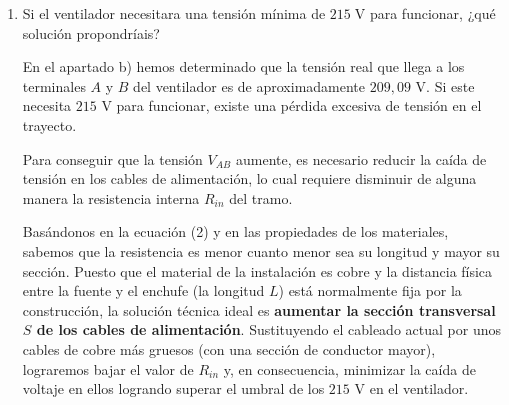 \documentclass[11pt, a4paper]{article}
\newenvironment{problem}[1][Cuestión]{
		\vspace{0.5cm}
		\noindent{\Large\bfseries #1} \par\vspace{0.5cm}
}{
		\vspace{0.5cm}
}
\begin{document}
\begin{problem}[Cuestión 2]
\begin{enumerate}[label=\alph*)]
{					Despejando la sección $S$ de la fórmula anterior, tenemos:
					$$S = \rho \frac{L}{R_{in}} = 1,68 \cdot 10^{-8} \; \Omega \cdot \text{m} \cdot \frac{200 \text{ m}}{2 \; \Omega} = 1,68 \cdot 10^{-6} \text{ m}^2$$

					Si transformamos este resultado a milímetros cuadrados (una unidad de medida más común para la superficie en electrónica), obtenemos:
					$$\boxed{S = 1,68 \text{ mm}^2}$$
				}

			\item Si el ventilador necesitara una tensión mínima de $215 \; \text{V}$ para funcionar, ¿qué solución propondríais?

				{ \color{blue} 
					En el apartado b) hemos determinado que la tensión real que llega a los terminales $A$ y $B$ del ventilador es de aproximadamente $209,09 \text{ V}$. Si este necesita $215 \text{ V}$ para funcionar, existe una pérdida excesiva de tensión en el trayecto.

					Para conseguir que la tensión $V_{AB}$ aumente, es necesario reducir la caída de tensión en los cables de alimentación, lo cual requiere disminuir de alguna manera la resistencia interna $R_{in}$ del tramo.

					Basándonos en la ecuación (2) y en las propiedades de los materiales, sabemos que la resistencia es menor cuanto menor sea su longitud y mayor su sección. Puesto que el material de la instalación es cobre y la distancia física entre la fuente y el enchufe (la longitud $L$) está normalmente fija por la construcción, la solución técnica ideal es \textbf{aumentar la sección transversal $S$ de los cables de alimentación}. Sustituyendo el cableado actual por unos cables de cobre más gruesos (con una sección de conductor mayor), lograremos bajar el valor de $R_{in}$ y, en consecuencia, minimizar la caída de voltaje en ellos logrando superar el umbral de los $215 \text{ V}$ en el ventilador.
				}
		\end{enumerate}
	\end{problem}
\end{document}
